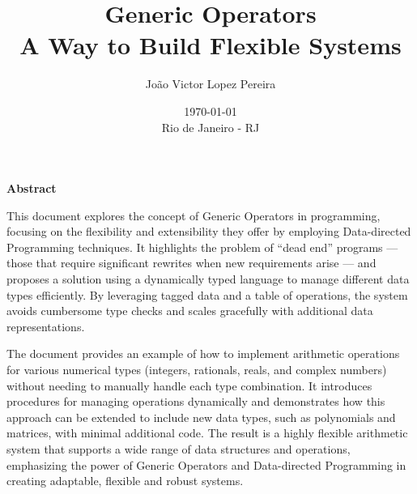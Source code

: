 \title{
  Generic Operators \\
  A Way to Build Flexible Systems
}
\date{
  \today\\
  \vfill
  Rio de Janeiro - RJ
}
\author{
  João Victor Lopez Pereira
}
\maketitle\newpage

\begin{center} \textbf{Abstract}  \end{center}
\par
This document explores the concept of Generic Operators in programming, focusing on the flexibility and extensibility they offer by employing Data-directed Programming techniques. It highlights the problem of ``dead end'' programs --- those that require significant rewrites when new requirements arise --- and proposes a solution using a dynamically typed language to manage different data types efficiently. By leveraging tagged data and a table of operations, the system avoids cumbersome type checks and scales gracefully with additional data representations.

The document provides an example of how to implement arithmetic operations for various numerical types (integers, rationals, reals, and complex numbers) without needing to manually handle each type combination. It introduces procedures for managing operations dynamically and demonstrates how this approach can be extended to include new data types, such as polynomials and matrices, with minimal additional code. The result is a highly flexible arithmetic system that supports a wide range of data structures and operations, emphasizing the power of Generic Operators and Data-directed Programming in creating adaptable, flexible and robust systems.

